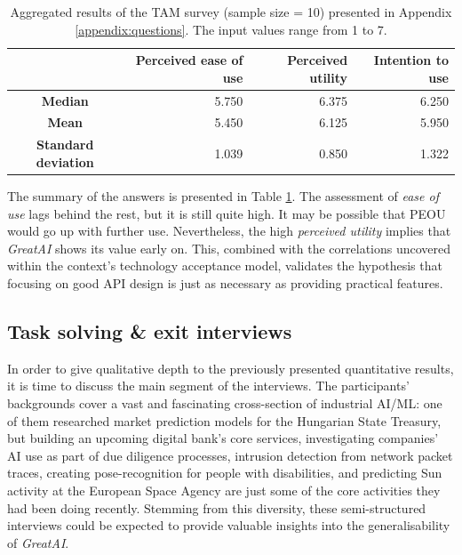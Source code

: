 \begin{table}
\centering
\captionsetup{width=.9\linewidth}
\caption{Aggregated results of the TAM survey (sample size = 10) presented in Appendix \ref{appendix:questions}. The input values range from 1 to 7.}
\label{table:tam}
{\renewcommand{\arraystretch}{1.1} %
\begin{tabular}{|c|r|r|r|} \hline
                            & \textbf{Perceived ease of use} & \textbf{Perceived utility} & \textbf{Intention to use} \\\hline
\textbf{Median}             & 5.750                          & 6.375                      & 6.250                     \\\hline
\textbf{Mean}               & 5.450                          & 6.125                      & 5.950                     \\\hline
\textbf{Standard deviation} & 1.039                          & 0.850                      & 1.322                     \\\hline
\end{tabular}}
\end{table}

The summary of the answers is presented in Table \ref{table:tam}. The assessment of \textit{ease of use} lags behind the rest, but it is still quite high. It may be possible that PEOU would go up with further use. Nevertheless, the high \textit{perceived utility} implies that \textit{GreatAI} shows its value early on. This, combined with the correlations uncovered within the context's technology acceptance model, validates the hypothesis that focusing on good API design is just as necessary as providing practical features.

\subsection{Task solving \& exit interviews}

In order to give qualitative depth to the previously presented quantitative results, it is time to discuss the main segment of the interviews. The participants' backgrounds cover a vast and fascinating cross-section of industrial AI/ML: one of them researched market prediction models for the Hungarian State Treasury, but building an upcoming digital bank's core services, investigating companies' AI use as part of due diligence processes, intrusion detection from network packet traces, creating pose-recognition for people with disabilities, and predicting Sun activity at the European Space Agency are just some of the core activities they had been doing recently. Stemming from this diversity, these semi-structured interviews could be expected to provide valuable insights into the generalisability of \textit{GreatAI}.

